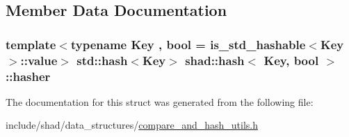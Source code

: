 \subsection{Member Data Documentation}
\hypertarget{structshad_1_1hash_ac9882386ae06eafe4720d76e1356c6b1}{
\subsubsection[{hasher}]{\setlength{\rightskip}{0pt plus 5cm}template$<$typename Key , bool  = is\-\_\-std\-\_\-hashable$<$\-Key$>$\-::value$>$ std\-::hash$<$Key$>$ {\bf shad\-::hash}$<$ Key, bool $>$\-::hasher}}\label{structshad_1_1hash_ac9882386ae06eafe4720d76e1356c6b1}


The documentation for this struct was generated from the following file\-:\begin{DoxyCompactItemize}
\item 
include/shad/data\-\_\-structures/\hyperlink{compare__and__hash__utils_8h}{compare\-\_\-and\-\_\-hash\-\_\-utils.\-h}\end{DoxyCompactItemize}
